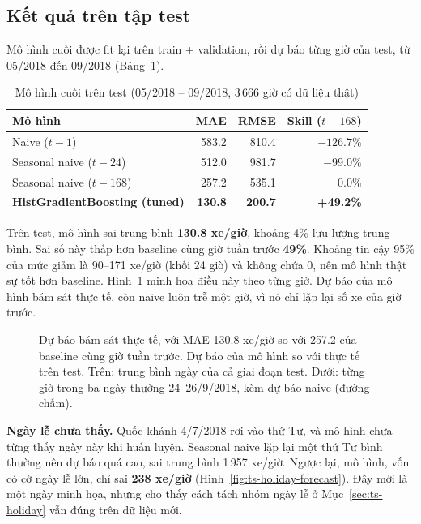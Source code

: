 \subsection{Kết quả trên tập test}
\label{sec:ts-test}
Mô hình cuối được fit lại trên train + validation, rồi dự báo từng giờ của test, từ 05/2018 đến 09/2018 (Bảng~\ref{tab:ts-results}).

\begin{table}[H]
\centering
\caption{Mô hình cuối trên test (05/2018 -- 09/2018, 3\,666 giờ có dữ liệu thật)}
\label{tab:ts-results}
\small\setlength{\tabcolsep}{4pt}
\begin{tabular}{lrrr}
\toprule
Mô hình & MAE & RMSE & Skill ($t-168$)\\
\midrule
Naive ($t-1$) & 583.2 & 810.4 & $-126.7\%$\\
Seasonal naive ($t-24$) & 512.0 & 981.7 & $-99.0\%$\\
Seasonal naive ($t-168$) & 257.2 & 535.1 & 0.0\%\\
\textbf{HistGradientBoosting (tuned)} & \textbf{130.8} & \textbf{200.7} & \textbf{+49.2\%}\\
\bottomrule
\end{tabular}
\end{table}

Trên test, mô hình sai trung bình \textbf{130.8 xe/giờ}, khoảng 4\% lưu lượng trung bình. Sai số này thấp hơn baseline cùng giờ tuần trước
\textbf{49\%}. Khoảng tin cậy 95\% của mức giảm là 90--171 xe/giờ (khối 24 giờ) và không chứa 0, nên mô hình thật sự tốt hơn baseline.
Hình~\ref{fig:ts-forecast} minh họa điều này theo từng giờ. Dự báo của mô hình bám sát thực tế, còn naive luôn trễ một giờ, vì nó chỉ lặp lại
số xe của giờ trước.

\begin{figure}[H]
\centering
{}
\caption{Dự báo bám sát thực tế, với MAE 130.8 xe/giờ so với 257.2 của baseline cùng giờ tuần trước. Dự báo của mô hình so với thực tế
trên test. Trên: trung bình ngày của cả giai đoạn test. Dưới: từng giờ trong ba ngày thường
24--26/9/2018, kèm dự báo naive (đường chấm).}
\label{fig:ts-forecast}
\end{figure}

\textbf{Ngày lễ chưa thấy.} Quốc khánh 4/7/2018 rơi vào thứ Tư, và mô hình chưa từng thấy ngày này khi huấn luyện. Seasonal naive lặp lại
một thứ Tư bình thường nên dự báo quá cao, sai trung bình 1\,957 xe/giờ. Ngược lại, mô hình, vốn có cờ ngày lễ lớn, chỉ sai
\textbf{238 xe/giờ} (Hình~\ref{fig:ts-holiday-forecast}). Đây mới là một ngày minh họa, nhưng cho thấy cách tách nhóm ngày lễ ở
Mục~\ref{sec:ts-holiday} vẫn đúng trên dữ liệu mới.

